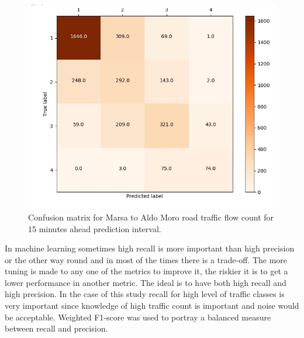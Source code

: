 \documentclass[12pt, a4paper]{report}
\theoremstyle{definition}
\theoremstyle{definition}%
\theoremstyle{definition}%
\theoremstyle{definition}%
\theoremstyle{definition}%
\theoremstyle{definition}%
\begin{document}
\begin{figure}[h]	
	\includegraphics[scale=0.7]{confusion_matrix_marsa_aldo_moro_342_4bin_15min.jpg}
	\centering
	\caption[Confusion matrix Marsa to Aldo Moro traffic flow prediciton]{Confusion matrix for Marsa to Aldo Moro road traffic flow count for 15 minutes ahead prediction interval.}
	\label{fig:confusion_matrix_marsa_aldo_moro_15min}
\end{figure}

In machine learning sometimes high recall is more important than high precision or the other way round and in most of the times there is a trade-off. The more tuning is made to any one of the metrics to improve it, the riskier it is to get a lower performance in another metric.  The ideal is to have both high recall and high precision. In the case of this study recall for high level of traffic classes is very important since knowledge of high traffic count is important and noise would be acceptable. Weighted F1-score was used to portray a balanced measure between recall and precision.
\end{document}
